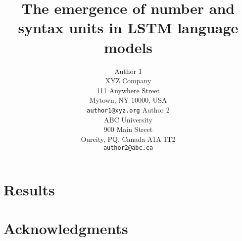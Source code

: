 \documentclass[11pt,letterpaper]{article}
\title{The emergence of number and syntax units in LSTM language models}
\author{Author 1\\
	    XYZ Company\\
	    111 Anywhere Street\\
	    Mytown, NY 10000, USA\\
	    {\tt author1@xyz.org}
	  \And
	Author 2\\
  	ABC University\\
  	900 Main Street\\
  	Ourcity, PQ, Canada A1A 1T2\\
  {\tt author2@abc.ca}}
\date{}
\begin{document}
\maketitle









\section{Results}
\lipsum[1]






\section*{Acknowledgments}
\lipsum[1]



\end{document}
